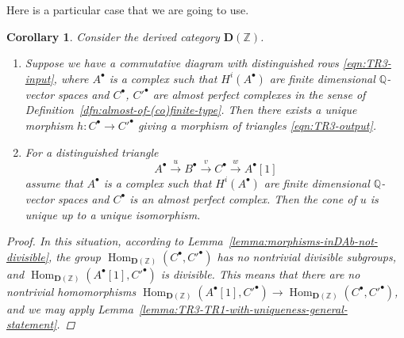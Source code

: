 \documentclass[leqno,12pt]{article}
\theoremstyle{plain}
\newtheorem{corollary}[theorem]{\indent\sc Corollary}
\theoremstyle{definition}
\DeclareMathOperator{\Hom}{Hom}
\newcommand{\QQ}{\mathbb{Q}}
\newcommand{\ZZ}{\mathbb{Z}}
\newcommand{\DZ}{{\mathbf{D} (\ZZ)}}
\begin{document}
Here is a particular case that we are going to use.

\begin{corollary}
  \label{cor:TR3-TR1-with-uniqueness}
  Consider the derived category $\DZ$.

  \begin{enumerate}
  \item[$1)$] Suppose we have a commutative diagram with distinguished rows
    \eqref{eqn:TR3-input}, where $A^\bullet$ is a complex such that
    $H^i (A^\bullet)$ are finite dimensional $\QQ$-vector spaces and
    $C^\bullet$, $C'^\bullet$ are almost perfect complexes in the sense of
    Definition~{\rm\ref{dfn:almost-of-(co)finite-type}}. Then there exists a
    unique morphism ${h\colon C^\bullet \to C'^\bullet}$ giving a morphism of
    triangles \eqref{eqn:TR3-output}.

  \item[$2)$] For a distinguished triangle
    $$A^\bullet \xrightarrow{u} B^\bullet \xrightarrow{v} C^\bullet \xrightarrow{w} A^\bullet[1]$$
    assume that $A^\bullet$ is a complex such that $H^i (A^\bullet)$ are finite
    dimensional $\QQ$-vector spaces and $C^\bullet$ is an almost perfect
    complex. Then the cone of $u$ is unique up to a unique isomorphism.
  \end{enumerate}

  \begin{proof}
    In this situation, according to
    Lemma~\ref{lemma:morphisms-inDAb-not-divisible}, the group
    $\Hom_\DZ (C^\bullet, C'^\bullet)$ has no nontrivial
    divisible subgroups, and
    $\Hom_\DZ (A^\bullet [1], C'^\bullet)$ is divisible. This
    means that there are no nontrivial homomorphisms
    $\Hom_\DZ (A^\bullet [1], C'^\bullet) \to \Hom_\DZ (C^\bullet, C'^\bullet)$,
    and we may apply
    Lemma~\ref{lemma:TR3-TR1-with-uniqueness-general-statement}.
  \end{proof}
\end{corollary}
\end{document}
